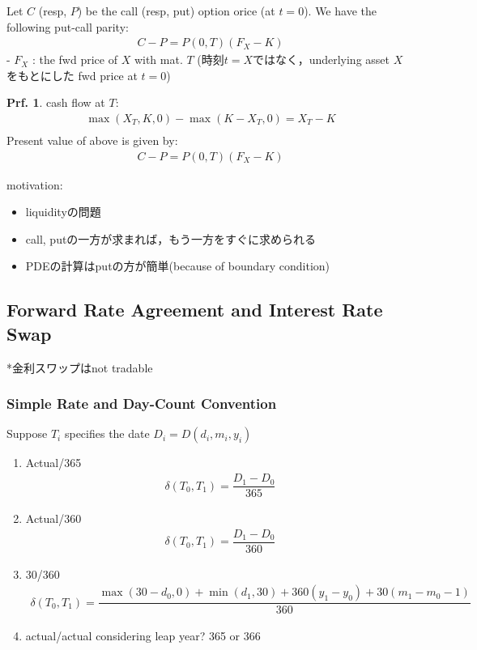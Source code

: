 \documentclass[a4paper,11pt]{jsarticle}
\theoremstyle{definition}
\newtheorem{prf}{Prf.}[subsection]
\newcommand{\df}[2]{\dfrac{#1}{#2}}
\begin{document}
Let $C$ (resp, $P$) be the call (resp, put) option orice
(at $t=0$). We have the following put-call parity:
\begin{align}
  C-P=P(0,T)(F_X-K)
\end{align}
- $F_X$ : the fwd price of $X$ with mat. $T$
(時刻$t=X$ではなく，underlying asset $X$ をもとにした
fwd price at $t=0$)

\begin{prf}
  cash flow at $T$:
  \begin{align}
    \max(X_T,K,0)-\max(K-X_T,0)=X_T-K \\
  \end{align}
  Present value of above is given by:
  \begin{align}
    C-P=P(0,T)(F_X-K)
  \end{align}
\end{prf}

motivation:
\begin{itemize}
  \item liquidityの問題
  \item call, putの一方が求まれば，もう一方をすぐに求められる
  \item PDEの計算はputの方が簡単(because of boundary condition)
\end{itemize}



\subsection{Forward Rate Agreement and Interest Rate Swap}
*金利スワップはnot tradable

\subsubsection{Simple Rate and Day-Count Convention}
Suppose $T_i$ specifies the date $D_i=D(d_i, m_i, y_i)$
\begin{enumerate}
  \item{Actual/365}
  \begin{align}
    \delta(T_0, T_1)=\df{D_1-D_0}{365}
  \end{align}
  \item{Actual/360}
  \begin{align}
    \delta(T_0, T_1)=\df{D_1-D_0}{360}
  \end{align}
  \item{30/360}
  \begin{align}
    \delta(T_0, T_1)
    =\df{\max(30-d_0,0)+\min(d_1,30)+360(y_1-y_0)
    +30(m_1-m_0-1)}{360}
  \end{align}
  \item{actual/actual} considering leap year? 365 or 366
\end{enumerate}
\end{document}
